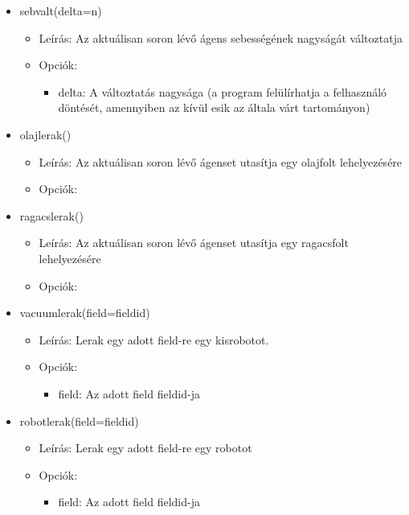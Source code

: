 \begin{itemize}
    \item sebvalt(delta=n)
    \begin{itemize}
        \item Leírás: Az aktuálisan soron lévő ágens sebességének nagyságát változtatja
        \item Opciók: 
            \begin{itemize}
                \item delta: A változtatás nagysága (a program felülírhatja a felhasználó döntését, amennyiben az kívül esik az általa várt tartományon) 
            \end{itemize}
    \end{itemize}

    \item olajlerak()
    \begin{itemize}
        \item Leírás: Az aktuálisan soron lévő ágenset utasítja egy olajfolt lehelyezésére
        \item Opciók: 
    \end{itemize}

    \item ragacslerak()
    \begin{itemize}
        \item Leírás: Az aktuálisan soron lévő ágenset utasítja egy ragacsfolt lehelyezésére
        \item Opciók: 
    \end{itemize}
    
    \item vacuumlerak(field=fieldid)
    \begin{itemize}
    	\item Leírás: Lerak egy adott field-re egy kisrobotot.
       	\item Opciók: 
            \begin{itemize}
                  	\item field: Az adott field fieldid-ja
            \end{itemize}	
    \end{itemize}
    
    \item robotlerak(field=fieldid)
    \begin{itemize}
    	\item Leírás: Lerak egy adott field-re egy robotot
    	\item Opciók: 
    	\begin{itemize}
    		\item field: Az adott field fieldid-ja
    	\end{itemize}	
    \end{itemize}      
    

\end{itemize}
